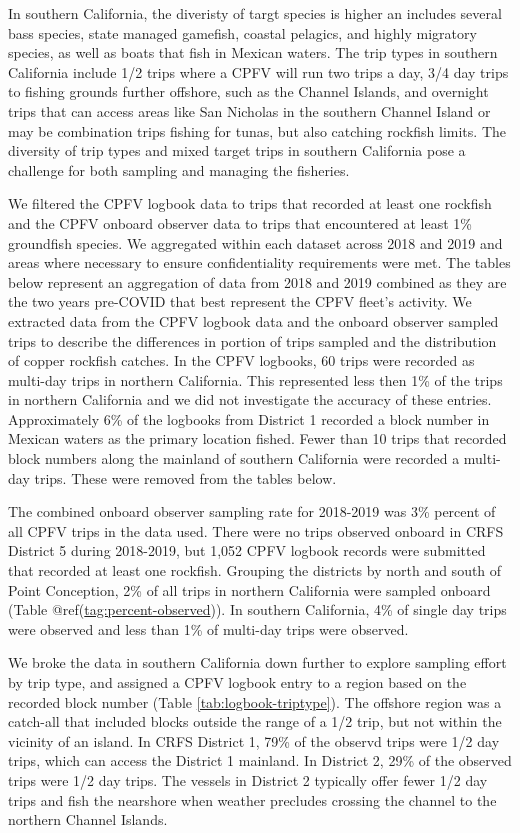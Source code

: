 \documentclass[11pt,
  english,
  letterpaper,
]{article}
\begin{document}
In southern California, the diveristy of targt species is higher an includes several bass species, state managed gamefish, coastal pelagics, and highly migratory species, as well as boats that fish in Mexican waters. The trip types in southern California include 1/2 trips where a CPFV will run two trips a day, 3/4 day trips to fishing grounds further offshore, such as the Channel Islands, and overnight trips that can access areas like San Nicholas in the southern Channel Island or may be combination trips fishing for tunas, but also catching rockfish limits. The diversity of trip types and mixed target trips in southern California pose a challenge for both sampling and managing the fisheries.

We filtered the CPFV logbook data to trips that recorded at least one rockfish and the CPFV onboard observer data to trips that encountered at least 1\% groundfish species. We aggregated within each dataset across 2018 and 2019 and areas where necessary to ensure confidentiality requirements were met. The tables below represent an aggregation of data from 2018 and 2019 combined as they are the two years pre-COVID that best represent the CPFV fleet's activity. We extracted data from the CPFV logbook data and the onboard observer sampled trips to describe the differences in portion of trips sampled and the distribution of copper rockfish catches. In the CPFV logbooks, 60 trips were recorded as multi-day trips in northern California. This represented less then 1\% of the trips in northern California and we did not investigate the accuracy of these entries. Approximately 6\% of the logbooks from District 1 recorded a block number in Mexican waters as the primary location fished. Fewer than 10 trips that recorded block numbers along the mainland of southern California were recorded a multi-day trips. These were removed from the tables below.

The combined onboard observer sampling rate for 2018-2019 was 3\% percent of all CPFV trips in the data used. There were no trips observed onboard in CRFS District 5 during 2018-2019, but 1,052 CPFV logbook records were submitted that recorded at least one rockfish. Grouping the districts by north and south of Point Conception, 2\% of all trips in northern California were sampled onboard (Table @ref(\url{tag:percent-observed})). In southern California, 4\% of single day trips were observed and less than 1\% of multi-day trips were observed.

We broke the data in southern California down further to explore sampling effort by trip type, and assigned a CPFV logbook entry to a region based on the recorded block number (Table \ref{tab:logbook-triptype}). The offshore region was a catch-all that included blocks outside the range of a 1/2 trip, but not within the vicinity of an island. In CRFS District 1, 79\% of the observd trips were 1/2 day trips, which can access the District 1 mainland. In District 2, 29\% of the observed trips were 1/2 day trips. The vessels in District 2 typically offer fewer 1/2 day trips and fish the nearshore when weather precludes crossing the channel to the northern Channel Islands.
\end{document}
